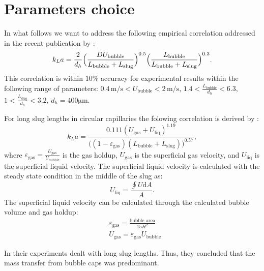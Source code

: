 \documentclass{article}
\begin{document}
\section{Parameters choice}
In what follows we want to address the following empirical correlation addressed in the recent
publication by \citet{yue-mass}:
\begin{equation}
k_L a=\frac{2}{d_h} \Bigl(\frac{D
U_{\mathrm{bubble}}}{L_{\mathrm{bubble}}+L_{\mathrm{slug}}}\Bigr)^{0.5}
\Bigl(\frac{L_{\mathrm{bubble}}}{L_{\mathrm{bubble}}+L_{\mathrm{slug}}}\Bigr)^{0.3}.
\end{equation}
This correlation is within $10\%$ accuracy for experimental results within the following range of
parameters: $0.4\,\mathrm{m/s}<U_{\mathrm{bubble}}<2\,\mathrm{m/s}$,
$1.4<\frac{L_{\mathrm{bubble}}}{d_h}<6.3$, $1<\frac{L_{\mathrm{slug}}}{d_h}<3.2$, $d_h = 400
\mathrm{\mu m}$.

For long slug lengths in circular capillaries the folowing correlation is derived by
\citet{bercic-mass}:
\begin{equation}
k_L a = \frac{0.111
(U_{\mathrm{gas}}+U_{\mathrm{liq}})^{1.19}}{\bigl((1-\varepsilon_{\mathrm{gas}})(L_{\mathrm{bubble}}
+L_ {\mathrm{slug}} )\bigr)^{0.57} },
\end{equation}
where $\varepsilon_{\mathrm{gas}}=\frac{U_{\mathrm{gas}}}{U_{\mathrm{bubble}}}$ is the gas holdup,
$U_{\mathrm{gas}}$ is the superficial gas velocity, and $U_{\mathrm{liq}}$ is the superficial
liquid velocity. The superficial liquid velocity is calculated with the steady state condition in
the middle of the slug as:
\begin{equation}
U_{\mathrm{liq}}=\frac{\oint U \mathrm{d}A}{A}.
\end{equation}
The superficial liquid velocity can be calculated through the calculated bubble volume and gas
holdup:
\begin{equation}
\begin{aligned}
&\varepsilon_{\mathrm{gas}}=\frac{\text{bubble area}}{15 H^2}\\
&U_{\mathrm{gas}}=\varepsilon_{\mathrm{gas}} U_{\mathrm{bubble}}
\end{aligned}
\end{equation}
 

In their experiments \citeauthor{bercic-mass} dealt with long slug lengths.
Thus, they concluded that the mass transfer from bubble caps was predominant.
\end{document}
